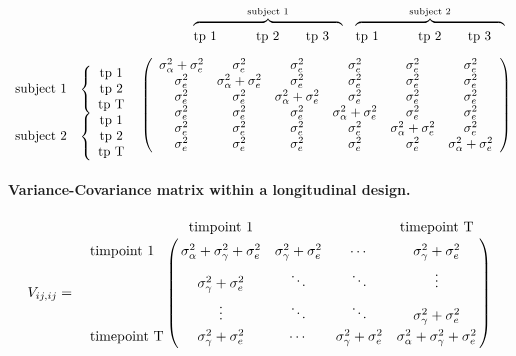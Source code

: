 \documentclass{article}
\begin{document}
\begin{small}
\begin{eqnarray*}
  \begin{array}{cccccc}
  \multicolumn{3}{c}{\overbrace{\rule{4cm}{0pt}}^{\textrm{subject 1}}} & \multicolumn{3}{c}{\overbrace{\rule{4cm}{0pt}}^{\textrm{subject 2}}}\\[-2pt]
  \textrm{tp 1}	\qquad &\textrm{tp 2}	&\textrm{tp 3}&\textrm{tp 1}\qquad	&\textrm{tp 2}	&\textrm{tp 3}\cr
  \end{array}\cr
  \begin{array}{c}  
  	\cr
	\cr
 	\textrm{subject 1} \cr
	\cr
	\cr
 	\textrm{subject 2} \cr
	\cr
 \end{array}
 \begin{array}{c}  
  	\cr
	\left\{
	\begin{array}{c}  
		\textrm{tp 1} 	\cr
 		\textrm{tp 2} \cr
		\textrm{tp T}	\cr
 	\end{array}\right.	\cr
	\left\{
	\begin{array}{c}  
		\textrm{tp 1} 	\cr
 		\textrm{tp 2} \cr
		\textrm{tp T}	\cr
 	\end{array}\right.	\cr
 \end{array}
 \left(
  \begin{array}{cccccc}
 \sigma_{\alpha}^2 + \sigma_{e}^2	&\sigma_{e}^2							&  \sigma_{e}^2
				&\sigma_{e}^2	&\sigma_{e}^2							&  \sigma_{e}^2\cr
\sigma_{e}^2 						&  \sigma_{\alpha}^2 +  \sigma_{e}^2 	& \sigma_{e}^2 
 				&\sigma_{e}^2	&\sigma_{e}^2							&  \sigma_{e}^2\cr
\sigma_{e}^2 						&	\sigma_{e}^2						& \sigma_{\alpha}^2 +  \sigma_{e}^2
				&\sigma_{e}^2	&\sigma_{e}^2							&  \sigma_{e}^2\cr
\sigma_{e}^2	&\sigma_{e}^2							&  \sigma_{e}^2&\sigma_{\alpha}^2 + \sigma_{e}^2	&\sigma_{e}^2							&  \sigma_{e}^2\cr
 \sigma_{e}^2	&\sigma_{e}^2							&  \sigma_{e}^2&\sigma_{e}^2 						&  \sigma_{\alpha}^2 +  \sigma_{e}^2 	& \sigma_{e}^2 \cr
\sigma_{e}^2	&\sigma_{e}^2							&  \sigma_{e}^2&\sigma_{e}^2 						&	\sigma_{e}^2						& \sigma_{\alpha}^2 +  \sigma_{e}^2\cr
	\end{array}
	\right)\cr
\end{eqnarray*}
\end{small}

\paragraph{Variance-Covariance matrix within a  longitudinal design.}

\begin{eqnarray*}
V_{ij , ij} &=&  \bordermatrix{
  						&\textrm{timpoint 1}	&	& 	&\textrm{timepoint T}\cr
\textrm{timpoint 1} 	&\sigma_{\alpha}^2 + \sigma_{\gamma}^2 + \sigma_{e}^2	&\sigma_{\gamma}^2 + \sigma_{e}^2			&\cdots		& \sigma_{\gamma}^2 + \sigma_{e}^2\cr
 						&\sigma_{\gamma}^2 + \sigma_{e}^2 		& \ddots	&\ddots		& \vdots \cr
 						&\vdots &\ddots		&\ddots		&\sigma_{\gamma}^2 + \sigma_{e}^2  \cr
\textrm{timepoint T}	&\sigma_{\gamma}^2 + \sigma_{e}^2 		&\cdots		&	\sigma_{\gamma}^2 + \sigma_{e}^2		& \sigma_{\alpha}^2 + \sigma_{\gamma}^2 + \sigma_{e}^2\cr
}
\end{eqnarray*}
\end{document}
